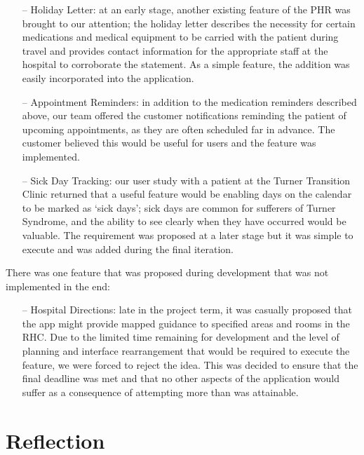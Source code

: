 \documentclass{l3proj}
\begin{document}
\begin{itemize}
\item[--]Holiday Letter: at an early stage, another existing feature of the PHR was brought to our attention; the holiday letter describes the necessity for certain medications and medical equipment to be carried with the patient during travel and provides contact information for the appropriate staff at the hospital to corroborate the statement. As a simple feature, the addition was easily incorporated into the application.

\item[--]Appointment Reminders: in addition to the medication reminders described above, our team offered the customer notifications reminding the patient of upcoming appointments, as they are often scheduled far in advance. The customer believed this would be useful for users and the feature was implemented.

\item[--]Sick Day Tracking: our user study with a patient at the Turner Transition Clinic returned that a useful feature would be enabling days on the calendar to be marked as `sick days'; sick days are common for sufferers of Turner Syndrome, and the ability to see clearly when they have occurred would be valuable. The requirement was proposed at a later stage but it was simple to execute and was added during the final iteration.
\end{itemize}

There was one feature that was proposed during development that was not implemented in the end:

\begin{itemize}
\item[--]Hospital Directions: late in the project term, it was casually proposed that the app might provide mapped guidance to specified areas and rooms in the RHC. Due to the limited time remaining for development and the level of planning and interface rearrangement that would be required to execute the feature, we were forced to reject the idea. This was decided to ensure that the final deadline was met and that no other aspects of the application would suffer as a consequence of attempting more than was attainable.
\end{itemize}


\section{Reflection} \label{sec:3}
\end{document}
